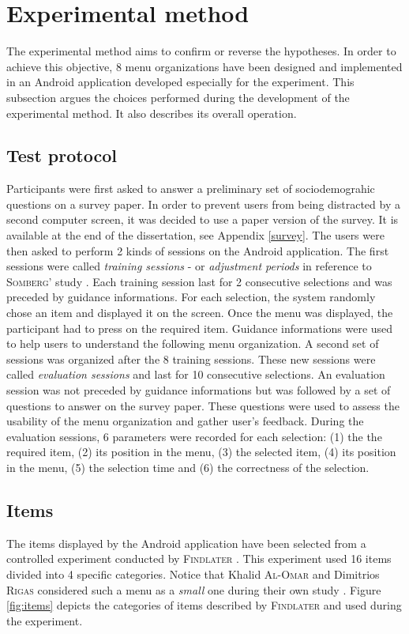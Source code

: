 \section{Experimental method}
The experimental method aims to confirm or reverse the hypotheses. In 
order to achieve this objective, 8 menu organizations have been designed and 
implemented in an Android application developed especially for the 
experiment. This subsection argues the choices performed during the development 
of the experimental method. It also describes its overall operation.

\subsection{Test protocol} \label{test_protocol}
Participants were first asked to answer a preliminary set of sociodemograhic 
questions on a survey paper. In order to prevent users from being distracted 
by a second computer screen, it was decided to use a paper version of the 
survey. It is available at the end of the dissertation, see Appendix 
\ref{survey}. The users were then asked to perform 2 kinds of sessions on the 
Android application. The first sessions were called 
\textit{training sessions} - or \textit{adjustment periods} in reference to 
\textsc{Somberg}' study \cite{somberg}. Each training session last for 2 
consecutive selections and was preceded by guidance informations. For each 
selection, the system randomly chose an item and displayed it on the screen. 
Once the menu was displayed, the participant had to press on the 
required item. Guidance informations were used to help users to understand the 
following menu organization. A second set of sessions was organized after the 8 
training sessions. These new sessions were called \textit{evaluation sessions} 
and last for 10 consecutive selections. An evaluation session was not preceded 
by guidance informations but was followed by a set of questions to answer on 
the survey paper. These questions were used to assess the usability of the menu 
organization and gather user's feedback. During the evaluation sessions, 6 
parameters were recorded for each selection: (1) the the required item, (2) 
its 
position in the menu, (3) the selected item, (4) its position in the menu, (5) 
the selection time and (6) the correctness of the selection.

\subsection{Items}
The items displayed by the Android application have been selected from a 
controlled experiment conducted by \textsc{Findlater} \cite{findlater}. This 
experiment 
used 16 items divided into 4 specific categories. Notice that Khalid 
\textsc{Al-Omar} and 
Dimitrios \textsc{Rigas} considered such a menu as a \textit{small} one during 
their own 
study \cite{alomar1}. Figure \ref{fig:items} depicts the categories of items 
described by \textsc{Findlater} and used during the experiment.\newline

